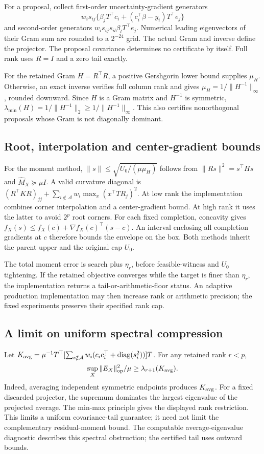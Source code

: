 For a proposal, collect first-order uncertainty-gradient generators
\[
 w_is_{ij}\{\beta_jT^\top c_i+(c_i^\top\beta-y_i)T^\top e_j\}
\]
and second-order generators $w_is_{ij}s_{il}\beta_lT^\top e_j$. Numerical leading eigenvectors of their Gram sum are rounded to a $2^{-24}$ grid. The actual Gram and inverse define the projector. The proposal covariance determines no certificate by itself. Full rank uses $R=I$ and a zero tail exactly.

For the retained Gram $H=R^\top R$, a positive Gershgorin lower bound supplies $\mu_H$. Otherwise, an exact inverse verifies full column rank and gives $\mu_H=1/\|H^{-1}\|_\infty$, rounded downward. Since $H$ is a Gram matrix and $H^{-1}$ is symmetric, $\lambda_{\min}(H)=1/\|H^{-1}\|_2\geq1/\|H^{-1}\|_\infty$. This also certifies nonorthogonal proposals whose Gram is not diagonally dominant.

\subsection{Root, interpolation and center-gradient bounds}
For the moment method, $\|s\|\leq\sqrt{U_0/(\mu\mu_H)}$ follows from $\|Rs\|^2=s^\top Hs$ and $\widehat M_X\succeq\mu I$. A valid curvature diagonal is $(R^\top KR)_{jj}+\sum_{i\notin\mathcal A}w_i\max_x(x^\top TR_j)^2$. At low rank the implementation combines corner interpolation and a center-gradient bound. At high rank it uses the latter to avoid $2^p$ root corners. For each fixed completion, concavity gives $f_X(s)\leq f_X(c)+\nabla f_X(c)^\top(s-c)$. An interval enclosing all completion gradients at $c$ therefore bounds the envelope on the box. Both methods inherit the parent upper and the original cap $U_0$.

The total moment error is search plus $\eta_r$, before feasible-witness and $U_0$ tightening. If the retained objective converges while the target is finer than $\eta_r$, the implementation returns a tail-or-arithmetic-floor status. An adaptive production implementation may then increase rank or arithmetic precision; the fixed experiments preserve their specified rank cap.

\subsection{A limit on uniform spectral compression}
Let $K_{\rm avg}=\mu^{-1}T^\top[\sum_{i\notin\mathcal A}w_i(c_ic_i^\top+\operatorname{diag}(s_i^2))]T$. For any retained rank $r<p$,
\[
 \sup_X\|E_X\|_{\mathrm{op}}^2/\mu\geq\lambda_{r+1}(K_{\rm avg}).
\]
Indeed, averaging independent symmetric endpoints produces $K_{\rm avg}$. For a fixed discarded projector, the supremum dominates the largest eigenvalue of the projected average. The min-max principle gives the displayed rank restriction. This limits a uniform covariance-tail guarantee; it need not limit the complementary residual-moment bound. The computable average-eigenvalue diagnostic describes this spectral obstruction; the certified tail uses outward bounds.


